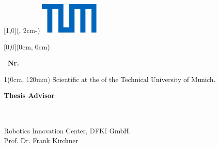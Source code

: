 \thispagestyle{empty}
\phantom{Hi mom!} %
\textblockorigin{\SeitenrandLinks}{\SeitenrandOben} %

{\sffamily

\begin{textblock*}{\UniversitaetLogoBreite}[1,0](\textwidth-1mm, 2cm-\SeitenrandOben)%
    \raggedleft\includegraphics{./00_Settings/TUM_Logo_RGB.pdf}%
\end{textblock*}



\begin{textblock*}{\textwidth}[0,0](0cm, 0cm)%
{\fontsize{24pt}{26pt}\selectfont\textbf{\thema}}


\vspace*{14pt}
{\fontsize{18pt}{27pt}\selectfont\textbf{\artderarbeit \, Nr. \, \arbeitnr}}
\end{textblock*}



\begin{textblock*}{1\textwidth}(0cm, 120mm)
	\fontsize{15pt}{17.5pt}\selectfont%
	Scientific %
	at the \fakultaet{} \ifthenelse{\equal{\studiengang}{}}{\\}{}%
	of the Technical University of Munich.
	
	\renewcommand{\baselinestretch}{1}
	\normalsize\selectfont
	\vspace*{12mm}
	\textbf{Thesis Advisor}\tab\hspace{-3cm}
	\begin{minipage}[t]{\textwidth-\CurrentLineWidth}
		\themenstellerlehrstuhl\\
		\themensteller \\
		Robotics Innovation Center, DFKI GmbH. \\
		Prof. Dr. Frank Kirchner
	\end{minipage}
	

\end{textblock*}}
